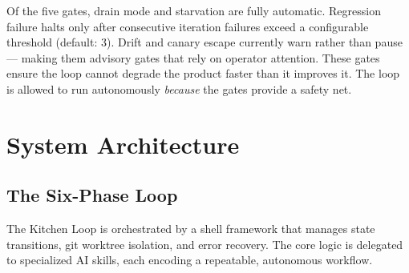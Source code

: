 \documentclass[11pt,a4paper]{article}
\begin{document}
Of the five gates, drain mode and starvation are fully automatic. Regression failure halts only after consecutive iteration failures exceed a configurable threshold (default: 3). Drift and canary escape currently warn rather than pause --- making them advisory gates that rely on operator attention. These gates ensure the loop cannot degrade the product faster than it improves it. The loop is allowed to run autonomously \emph{because} the gates provide a safety net.


\section{System Architecture}\label{sec:system-architecture}

\subsection{The Six-Phase Loop}\label{sec:six-phase-loop}

The Kitchen Loop is orchestrated by a shell framework that manages state transitions, git worktree isolation, and error recovery. The core logic is delegated to specialized AI skills, each encoding a repeatable, autonomous workflow.

\begin{figure}[h]
\centering
{}
\end{figure}
\end{document}
